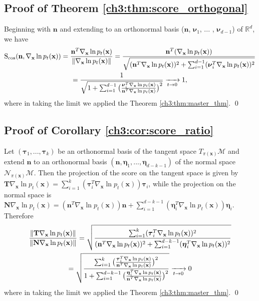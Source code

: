     \subsection*{Proof of Theorem \ref{ch3:thm:score_orthogonal}}
    Beginning with $\textbf{n}$ and extending to an orthonormal basis ($\textbf{n}$, $\boldsymbol{\nu}_1$, ... , $\boldsymbol{\nu}_{d-1}$) of $\mathbb{R}^d$, we have
    \begin{gather*}
        \text{S}_{\cos} (\textbf{n}, \nabla_\textbf{x} \ln p_t(\textbf{x})) = \frac{\textbf{n}^T\nabla_\textbf{x} \ln p_t(\textbf{x})}{\left\lVert \nabla_\textbf{x} \ln p_t(\textbf{x}) \right\rVert} 
        = \frac{\textbf{n}^T(\nabla_\textbf{x} \ln p_t(\textbf{x}))}{\sqrt{ (\textbf{n}^T\nabla_\textbf{x} \ln p_t(\textbf{x}))^2 + \sum_{i=1}^{d-1}(\boldsymbol{\nu}_i^T\nabla_\textbf{x} \ln p_t(\textbf{x}))^2 }} \\
        = \frac{1}{\sqrt{ 1 + \sum_{i=1}^{d-1}\big( \frac{\boldsymbol{\nu}_i^T\nabla_\textbf{x} \ln p_t(\textbf{x})}{\textbf{n}^T\nabla_\textbf{x} \ln p_t(\textbf{x})} \big)^2 }} 
         \xrightarrow[t \to 0]{} 1,
    \end{gather*}
    where in taking the limit we applied the Theorem \ref{ch3:thm:master_thm}. \qed
    
    \subsection*{Proof of Corollary \ref{ch3:cor:score_ratio}}
    Let $(\boldsymbol{\tau}_1, ..., \boldsymbol{\tau}_k)$ be an orthonormal basis of the tangent space $T_{\pi(\textbf{x})}\mathcal{M}$ and extend $\textbf{n}$ to an orthonormal basis $(\textbf{n}, \boldsymbol{\eta}_1, ..., \boldsymbol{\eta}_{d-k-1})$ of the normal space $\mathcal{N}_{\pi(\textbf{x})}\mathcal{M}$.
    Then the projection of the score on the tangent space is given by $\mathbf{T} \nabla_\textbf{x} \ln p_t(\textbf{x}) = \sum_{i=1}^k (\boldsymbol{\tau}_i^T\nabla_\textbf{x} \ln p_t(\textbf{x})) \boldsymbol{\tau}_i$, while the projection on the normal space is  $\mathbf{N} \nabla_\textbf{x} \ln p_t(\textbf{x}) = (\textbf{n}^T\nabla_\textbf{x} \ln p_t(\textbf{x})) \textbf{n} +  \sum_{i=1}^{d-k-1} (\boldsymbol{\eta}_i^T\nabla_\textbf{x} \ln p_t(\textbf{x})) \boldsymbol{\eta}_i$. Therefore
    \begin{gather*}
        \frac{\left\lVert \mathbf{T} \nabla_\textbf{x} \ln p_t(\textbf{x})  \right\rVert}{\left\lVert \mathbf{N} \nabla_\textbf{x} \ln p_t(\textbf{x})  \right\rVert} = \sqrt{\frac{\sum_{i=1}^k (\boldsymbol{\tau}_i^T\nabla_\textbf{x} \ln p_t(\textbf{x}))^2 }{ (\textbf{n}^T\nabla_\textbf{x} \ln p_t(\textbf{x}))^2 +  \sum_{i=1}^{d-k-1} (\boldsymbol{\eta}_i^T\nabla_\textbf{x} \ln p_t(\textbf{x}))^2 }}
        \\ = \sqrt{\frac{\sum_{i=1}^k \big( \frac{\boldsymbol{\tau}_i^T\nabla_\textbf{x} \ln p_t(\textbf{x})}{\textbf{n}^T\nabla_\textbf{x} \ln p_t(\textbf{x})} \big)^2 }{ 1 +  \sum_{i=1}^{d-k-1} \big( \frac{\boldsymbol{\eta}_i^T\nabla_\textbf{x} \ln p_t(\textbf{x})}{\textbf{n}^T\nabla_\textbf{x} \ln p_t(\textbf{x})} \big)^2 }}
        \xrightarrow[t \to 0]{} 0
    \end{gather*}
    where in taking the limit we applied the Theorem \ref{ch3:thm:master_thm}. \qed


